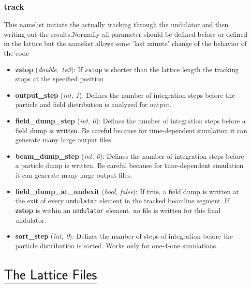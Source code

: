\documentclass[12pt]{book}
\begin{document}
\subsection{\sf track}
This namelist initiate the actually tracking through the undulator and then writing out the results.Normally all parameter should be defined before or defined in the lattice but the namelist allows some 'last minute' change of the behavior of the code

\begin{itemize}
\item {\bf zstop} ({\it double, 1e9}): If {\tt zstop} is shorter than the lattice length the tracking stops at the specified position
\item {\bf output\_step} ({\it int, 1}): Defines the number of integration steps before the particle and field distribution is analyzed for output.
\item {\bf field\_dump\_step} ({\it int, 0}): Defines the number of integration steps before a field dump is written. Be careful because for time-dependent simulation it can generate many large output files.
\item {\bf beam\_dump\_step} ({\it int, 0}): Defines the number of integration steps before a particle dump is written. Be careful because for time-dependent simulation it can generate many large output files.
\item {\bf field\_dump\_at\_undexit} ({\it bool, false}): If true, a field dump is written at the exit of every {\tt undulator} element in the tracked beamline segment. If {\bf zstop} is within an {\tt undulator} element, no file is written for this final undulator.
\item {\bf sort\_step} ({\it int, 0}): Defines the number of steps of integration before the particle distribution is sorted. Works only for one-4-one simulations.

\end{itemize}





\chapter*{\vspace{-3cm}$\underline{\mbox{\rule[-0.5em]{0cm}{1em}\huge\sf The Lattice Files}}$}
\end{document}
